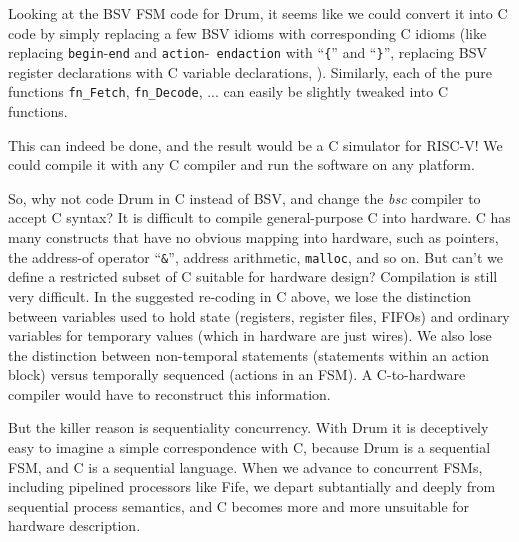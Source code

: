 Looking at the BSV FSM code for Drum, it seems like we could convert
it into C code by simply replacing a few BSV idioms with corresponding
C idioms (like replacing {\tt begin}-{\tt end} and {\tt action}-{\tt
endaction} with ``{\tt \{}'' and ``{\tt \}}'', replacing BSV register
declarations with C variable declarations, {\etc}).  Similarly, each
of the pure functions {\tt fn\_Fetch}, {\tt fn\_Decode}, ...  can
easily be slightly tweaked into C functions.

This can indeed be done, and the result would be a C simulator for
RISC-V!  We could compile it with any C compiler and run the software
on any platform.

So, why not code Drum in C instead of BSV, and change the \emph{bsc}
compiler to accept C syntax?  It is difficult to compile
general-purpose C into hardware.  C has many constructs that have no
obvious mapping into hardware, such as pointers, the address-of
operator ``\verb|&|'', address arithmetic, \verb|malloc|, and so on.
But can't we define a restricted subset of C suitable for hardware
design?  Compilation is still very difficult.  In the suggested
re-coding in C above, we lose the distinction between variables used
to hold state (registers, register files, FIFOs) and ordinary
variables for temporary values (which in hardware are just wires).  We
also lose the distinction between non-temporal statements (statements
within an action block) versus temporally sequenced (actions in an
FSM).  A C-to-hardware compiler would have to reconstruct this
information.

But the killer reason is sequentiality {\vs} concurrency.  With Drum
it is deceptively easy to imagine a simple correspondence with C,
because Drum is a sequential FSM, and C is a sequential language.
When we advance to concurrent FSMs, including pipelined processors
like Fife, we depart subtantially and deeply from sequential process
semantics, and C becomes more and more unsuitable for hardware
description.

\vspace{2ex}

